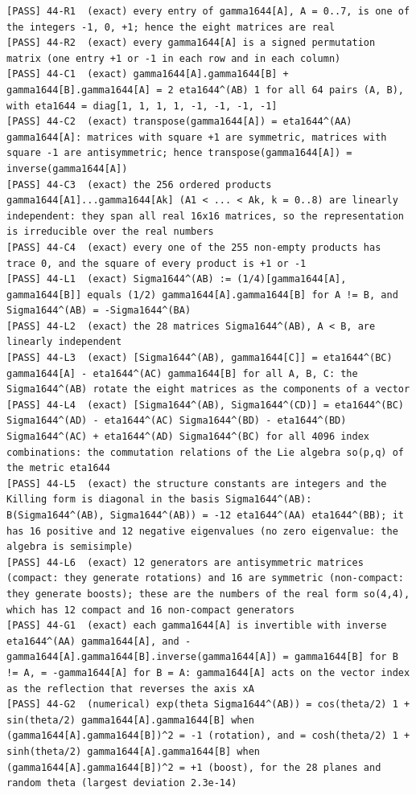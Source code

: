 \documentclass[
  10pt,
]{article}
\begin{document}
\begin{verbatim}
[PASS] 44-R1  (exact) every entry of gamma1644[A], A = 0..7, is one of the integers -1, 0, +1; hence the eight matrices are real
[PASS] 44-R2  (exact) every gamma1644[A] is a signed permutation matrix (one entry +1 or -1 in each row and in each column)
[PASS] 44-C1  (exact) gamma1644[A].gamma1644[B] + gamma1644[B].gamma1644[A] = 2 eta1644^(AB) 1 for all 64 pairs (A, B), with eta1644 = diag[1, 1, 1, 1, -1, -1, -1, -1]
[PASS] 44-C2  (exact) transpose(gamma1644[A]) = eta1644^(AA) gamma1644[A]: matrices with square +1 are symmetric, matrices with square -1 are antisymmetric; hence transpose(gamma1644[A]) = inverse(gamma1644[A])
[PASS] 44-C3  (exact) the 256 ordered products gamma1644[A1]...gamma1644[Ak] (A1 < ... < Ak, k = 0..8) are linearly independent: they span all real 16x16 matrices, so the representation is irreducible over the real numbers
[PASS] 44-C4  (exact) every one of the 255 non-empty products has trace 0, and the square of every product is +1 or -1
[PASS] 44-L1  (exact) Sigma1644^(AB) := (1/4)[gamma1644[A], gamma1644[B]] equals (1/2) gamma1644[A].gamma1644[B] for A != B, and Sigma1644^(AB) = -Sigma1644^(BA)
[PASS] 44-L2  (exact) the 28 matrices Sigma1644^(AB), A < B, are linearly independent
[PASS] 44-L3  (exact) [Sigma1644^(AB), gamma1644[C]] = eta1644^(BC) gamma1644[A] - eta1644^(AC) gamma1644[B] for all A, B, C: the Sigma1644^(AB) rotate the eight matrices as the components of a vector
[PASS] 44-L4  (exact) [Sigma1644^(AB), Sigma1644^(CD)] = eta1644^(BC) Sigma1644^(AD) - eta1644^(AC) Sigma1644^(BD) - eta1644^(BD) Sigma1644^(AC) + eta1644^(AD) Sigma1644^(BC) for all 4096 index combinations: the commutation relations of the Lie algebra so(p,q) of the metric eta1644
[PASS] 44-L5  (exact) the structure constants are integers and the Killing form is diagonal in the basis Sigma1644^(AB): B(Sigma1644^(AB), Sigma1644^(AB)) = -12 eta1644^(AA) eta1644^(BB); it has 16 positive and 12 negative eigenvalues (no zero eigenvalue: the algebra is semisimple)
[PASS] 44-L6  (exact) 12 generators are antisymmetric matrices (compact: they generate rotations) and 16 are symmetric (non-compact: they generate boosts); these are the numbers of the real form so(4,4), which has 12 compact and 16 non-compact generators
[PASS] 44-G1  (exact) each gamma1644[A] is invertible with inverse eta1644^(AA) gamma1644[A], and -gamma1644[A].gamma1644[B].inverse(gamma1644[A]) = gamma1644[B] for B != A, = -gamma1644[A] for B = A: gamma1644[A] acts on the vector index as the reflection that reverses the axis xA
[PASS] 44-G2  (numerical) exp(theta Sigma1644^(AB)) = cos(theta/2) 1 + sin(theta/2) gamma1644[A].gamma1644[B] when (gamma1644[A].gamma1644[B])^2 = -1 (rotation), and = cosh(theta/2) 1 + sinh(theta/2) gamma1644[A].gamma1644[B] when (gamma1644[A].gamma1644[B])^2 = +1 (boost), for the 28 planes and random theta (largest deviation 2.3e-14)

\end{verbatim}
\end{document}
